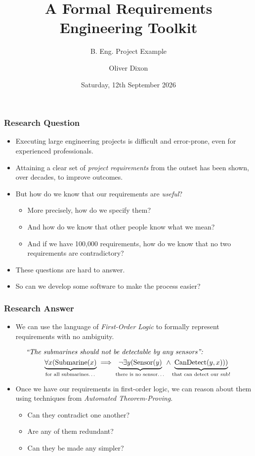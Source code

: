 \documentclass[aspectratio=169]{beamer}
\title[B. Eng. Project Example]{A Formal Requirements Engineering Toolkit}
\subtitle{B. Eng. Project Example}
\author{Oliver Dixon}
\institute[]{Department of Computer Science, University of York}
\date{Saturday, 12th September 2026}
\begin{document}
\frame{\titlepage}

\begin{frame}
    \frametitle{Research Question}
    \begin{itemize}
        \item Executing large engineering projects is difficult and error-prone,
            even for experienced professionals.
        \item Attaining a clear set of \emph{project requirements} from the 
            outset has been shown, over decades, to improve outcomes.
        \item But how do we know that our requirements are \emph{useful}?
            \begin{itemize}
                \item More precisely, how do we specify them?
                \item And how do we know that other people know what we mean?
                \item And if we have 100,000 requirements, how do we know that
                    no two requirements are contradictory?
            \end{itemize}
        \item These questions are hard to answer.
        \item So can we develop some software to make the process easier?
    \end{itemize}
\end{frame}

\begin{frame}
    \frametitle{Research Answer}
    \begin{itemize}
        \item We can use the language of \emph{First-Order Logic} to formally
            represent requirements with no ambiguity.
    \end{itemize}
    \begin{align*}
        \text{\itshape ``The } &\text{\itshape submarines should not be %
            detectable by any sensors'':} \\
        & \underbrace{\forall x ( \operatorname{Submarine}(x)}_%
            \text{for all submarines\ldots} \implies
          \underbrace{\lnot \exists y (\operatorname{Sensor}(y)}_%
            \text{there is no sensor\ldots} \land
          \underbrace{\operatorname{CanDetect}(y,x)))}_%
            \text{that can detect our sub!}
    \end{align*}
    \begin{itemize}
        \item Once we have our requirements in first-order logic, we can reason
            about them using techniques from \emph{Automated Theorem-Proving}.
            \begin{itemize}
                \item Can they contradict one another?
                \item Are any of them redundant?
                \item Can they be made any simpler?
            \end{itemize}
    \end{itemize}
\end{frame}
\end{document}

